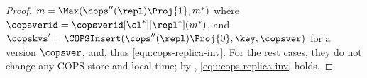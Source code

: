 \begin{toappendix}
\begin{proof}
    \( m =\Max(\cops''(\repl)\Proj{1},m^*) \) where \( \copsverid = \copsverid[\cl^*][\repl^*](m^*)\), 
    and \( \copskvs' = \COPSInsert(\cops''(\repl)\Proj{0},\key,\copsver) \) for a version \( \copsver \),
    and, thus \cref{equ:cops-replica-inv}.
    For the rest cases, they do not change any COPS store and local time;
    by \ih, \cref{equ:cops-replica-inv} holds. \qedhere
\end{proof}
\end{toappendix}


